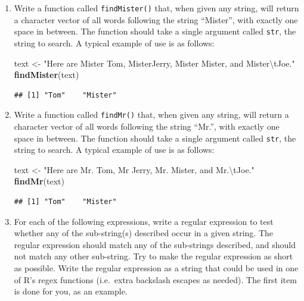 \documentclass[]{book}
\makeatletter
\newenvironment{Shaded}{\begin{snugshade}}{\end{snugshade}}
\newcommand{\KeywordTok}[1]{\textcolor[rgb]{0.13,0.29,0.53}{\textbf{#1}}}
\newcommand{\CharTok}[1]{\textcolor[rgb]{0.31,0.60,0.02}{#1}}
\newcommand{\StringTok}[1]{\textcolor[rgb]{0.31,0.60,0.02}{#1}}
\newcommand{\NormalTok}[1]{#1}
\newenvironment{kframe}{%
\medskip{}
\setlength{\fboxsep}{.8em}
 \def\at@end@of@kframe{}%
 \ifinner\ifhmode%
  \def\at@end@of@kframe{\end{minipage}}%
  \begin{minipage}{\columnwidth}%
 \fi\fi%
 \def\FrameCommand##1{\hskip\@totalleftmargin \hskip-\fboxsep
 \colorbox{shadecolor}{##1}\hskip-\fboxsep
     \hskip-\linewidth \hskip-\@totalleftmargin \hskip\columnwidth}%
 \MakeFramed {\advance\hsize-\width
   \@totalleftmargin\z@ \linewidth\hsize
   \@setminipage}}%
 {\par\unskip\endMakeFramed%
 \at@end@of@kframe}
\renewenvironment{Shaded}{\begin{kframe}}{\end{kframe}}
\theoremstyle{definition}
\theoremstyle{definition}
\theoremstyle{definition}
\theoremstyle{remark}
\makeatother
\begin{document}
{\begin{enumerate}
\def\labelenumi{\arabic{enumi}.}
\item
  Write a function called \texttt{findMister()} that, when given any
  string, will return a character vector of all words following the
  string ``Mister'', with exactly one space in between. The function
  should take a single argument called \texttt{str}, the string to
  search. A typical example of use is as follows:

\begin{Shaded}
\begin{Highlighting}[]
\NormalTok{text <-}\StringTok{ "Here are Mister Tom, MisterJerry, Mister Mister, and Mister}\CharTok{\textbackslash{}t}\StringTok{Joe."}
\KeywordTok{findMister}\NormalTok{(text)}
\end{Highlighting}
\end{Shaded}

\begin{verbatim}
## [1] "Tom"    "Mister"
\end{verbatim}
\item
  Write a function called \texttt{findMr()} that, when given any string,
  will return a character vector of all words following the string
  ``Mr.'', with exactly one space in between. The function should take a
  single argument called \texttt{str}, the string to search. A typical
  example of use is as follows:

\begin{Shaded}
\begin{Highlighting}[]
\NormalTok{text <-}\StringTok{ "Here are Mr. Tom, Mr Jerry, Mr. Mister, and Mr.}\CharTok{\textbackslash{}t}\StringTok{Joe."}
\KeywordTok{findMr}\NormalTok{(text)}
\end{Highlighting}
\end{Shaded}

\begin{verbatim}
## [1] "Tom"    "Mister"
\end{verbatim}
\item
  For each of the following expressions, write a regular expression to
  test whether any of the sub-string(s) described occur in a given
  string. The regular expression should match any of the sub-strings
  described, and should not match any other sub-string. Try to make the
  regular expression as short as possible. Write the regular expression
  as a string that could be used in one of R's regex functions
  (i.e.~extra backslash escapes as needed). The first item is done for
  you, as an example.


\end{enumerate}}
\end{document}
